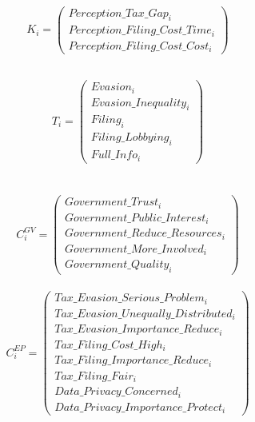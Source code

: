 \documentclass[11pt]{article}
\begin{document}
\begin{center}
{\[\begin{array}{ccc}
\end{array}
\]
}
\vspace{2em}
{\small
\[
\begin{array}{c}
K_{i} =
\left(
\begin{array}{c}
Perception\_Tax\_Gap_i \\ Perception\_Filing\_Cost\_Time_i \\ Perception\_Filing\_Cost\_Cost_i \end{array}
\right)
\end{array}
\]
}
\\[1em]
{\small
\[
\begin{array}{c}
\\[1em]
T_i =
\left(
\begin{array}{c}
Evasion_i \\
Evasion\_Inequality_i \\
Filing_i \\
Filing\_Lobbying_i \\
Full\_Info_i 
\end{array}
\right)
\end{array}
\]
}
\\[1em]
{\small

\[
\begin{array}{ccc}

C_i^{GV} =
\left(
\begin{array}{c}
Government\_Trust_i \\
Government\_Public\_Interest_i \\
Government\_Reduce\_Resources_i \\
Government\_More\_Involved_i \\
Government\_Quality_i 
\end{array}
\right)

\end{array}
\]

\[
\begin{array}{ccc}

C_i^{EP} =
\left(
\begin{array}{c}
Tax\_Evasion\_Serious\_Problem_i \\
Tax\_Evasion\_Unequally\_Distributed_i \\
Tax\_Evasion\_Importance\_Reduce_i \\[0.25em]
Tax\_Filing\_Cost\_High_i \\
Tax\_Filing\_Importance\_Reduce_i \\
Tax\_Filing\_Fair_i\\[0.25em]
Data\_Privacy\_Concerned_i \\
Data\_Privacy\_Importance\_Protect_i 
\end{array}
\right)


\end{array}\]}
\end{center}
\end{document}
